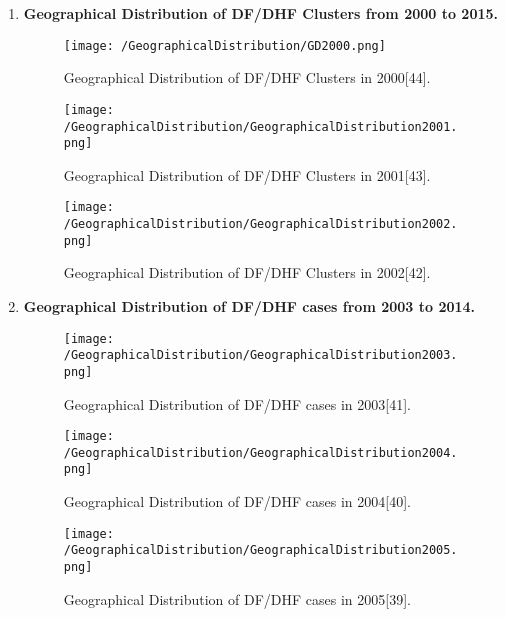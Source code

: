 \documentclass[11pt]{exam}
\begin{document}
\begin{questions}
\begin{enumerate}
\newpage
\item \textbf{Geographical Distribution of DF/DHF Clusters from 2000 to 2015.}
\begin{figure}[H]
  \centering
   \texttt{[image: /GeographicalDistribution/GD2000.png]} 
  \caption{Geographical Distribution of DF/DHF Clusters in 2000[44].}
   \label{Geographical Distribution of DF/DHF Clusters}
\end{figure} 


\begin{figure}[H]
  \centering
   \texttt{[image: /GeographicalDistribution/GeographicalDistribution2001.png]} 
  \caption{Geographical Distribution of DF/DHF Clusters in 2001[43].}
   \label{Geographical Distribution of DF/DHF Clusters}
\end{figure} 


\begin{figure}[H]
  \centering
   \texttt{[image: /GeographicalDistribution/GeographicalDistribution2002.png]} 
  \caption{Geographical Distribution of DF/DHF Clusters in 2002[42].}
   \label{Geographical Distribution of DF/DHF Clusters}
\end{figure} 

\newpage
\item \textbf{Geographical Distribution of DF/DHF cases from 2003 to 2014.}
\begin{figure}[H]
  \centering
   \texttt{[image: /GeographicalDistribution/GeographicalDistribution2003.png]} 
  \caption{Geographical Distribution of DF/DHF cases in 2003[41].}
   \label{Geographical Distribution of DF/DHF Clusters}
\end{figure} 


\begin{figure}[H]
  \centering
   \texttt{[image: /GeographicalDistribution/GeographicalDistribution2004.png]} 
  \caption{Geographical Distribution of DF/DHF cases in 2004[40].}
   \label{Geographical Distribution of DF/DHF Clusters}
\end{figure} 

\begin{figure}[H]
  \centering
   \texttt{[image: /GeographicalDistribution/GeographicalDistribution2005.png]} 
  \caption{Geographical Distribution of DF/DHF cases in 2005[39].}
   \label{Geographical Distribution of DF/DHF Clusters}
\end{figure} 


\end{enumerate}
\end{questions}
\end{document}
